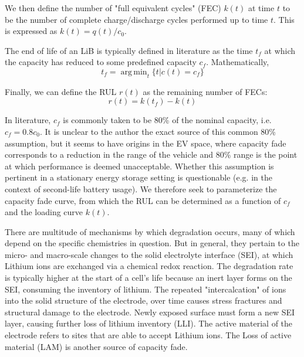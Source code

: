 \documentclass[conference]{IEEEtran}
\DeclareMathOperator*{\argmin}{arg\,min}
\begin{document}
We then define the number of "full equivalent cycles" (FEC) $k(t)$ at time $t$
to be the number of complete charge/discharge cycles performed up to
time $t$.  This is expressed as $k(t) = q(t) / c_0$.



The end of life of an LiB is typically defined in literature
as the time $t_f$ at which the capacity has reduced to some
predefined capacity $c_f$. Mathematically,
\begin{equation*}
    t_f = \argmin_t \{t | c(t) = c_f\}   
\end{equation*}

Finally, we can define the RUL $r(t)$ as the remaining number of FECs:
\begin{equation*}
    r(t) = k(t_f) - k(t)
\end{equation*}

In literature, $c_f$ is commonly taken to be 80\% of the nominal
capacity, i.e. $c_f = 0.8 c_0$.  It is unclear to the author the exact
source of this common 80\% assumption, but it seems to have origins
in the EV space, where capacity fade corresponds to a reduction in
the range of the vehicle and 80\% range is the point at which performance
is deemed unacceptable. Whether this assumption is pertinent
in a stationary energy storage setting is questionable (e.g. in the
context of second-life battery usage). We therefore seek to parameterize
the capacity fade curve, from which the RUL can be determined as 
a function of $c_f$ and the loading curve $k(t)$.

There are multitude of mechanisms by which degradation occurs, many
of which depend on the specific chemistries in question.
But in general, they pertain to the micro- and macro-scale changes to the solid electrolyte
interface (SEI), at which Lithium ions are exchanged via a chemical redox
reaction. The degradation rate is typically higher at the start of a cell's
life because an inert layer forms on the SEI, consuming the inventory of
lithium.  The repeated "intercalcation" of ions into the solid structure
of the electrode, over time causes stress fractures and structural damage to
the electrode. Newly exposed surface must form a new SEI layer, causing further
loss of lithium inventory (LLI). The active material of the electrode
refers to sites that are able to accept Lithium ions. The Loss of active material
(LAM) is another source of capacity fade.
\end{document}
